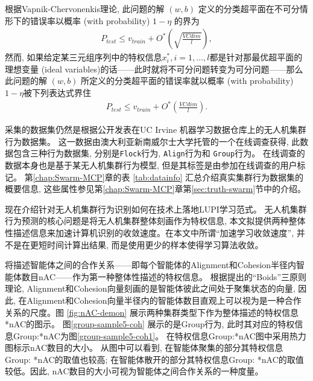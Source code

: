 根据Vapnik-Chervonenkis理论\citep{Vapnik2006}, 此问题的解 $(w,b)$ 定义的分类超平面在\textsf{不可分情形}下的错误率\textsc{以概率} (with probability) $1-\eta$ 的界为
\begin{align}
P_{test} \leq v_{train} + O^{*}(\sqrt{\frac{VCdim}{l}}),
\end{align}
然而, 如果给定某三元组序列中的特权信息$x_{i}^{*}, i=1,\ldots,l$都是针对那最优超平面的理想变量 (ideal variables)的话——此时就将\textsf{不可分问题}转变为\textsf{可分问题}——那么此问题的解 $(w,b)$ 所定义的分类超平面的错误率就\textsc{以概率} (with probability) $1-\eta$被下列表达式界住
\begin{align}
P_{test} \leq v_{train} + O^{*}(\frac{VCdim}{l}).
\end{align}


采集的数据集仍然是根据公开发表在UC Irvine 机器学习数据仓库上的无人机集群行为数据集。 这一数据由澳大利亚新南威尔士大学托管的一个在线调查获得, 此数据包含三种行为数据集, 分别是\texttt{Flock}行为, \texttt{Align}行为和 \texttt{Group}行为。 在线调查的数据本身也是基于某无人机集群行为模型, 但是其标签是由参加在线调查的用户标记。 第\ref{chap:Swarm-MCP}章的表 \ref{tab:datainfo} 汇总介绍真实集群行为数据集的概要信息, 这些属性参见第\ref{chap:Swarm-MCP}章第\ref{sec:truth-swarm}节中的介绍。

现在介绍针对无人机集群行为识别如何在技术上落地LUPI学习范式。 无人机集群行为预测的核心问题是将无人机集群整体刻画作为特权信息, 本文拟提供两种整体性描述信息来加速计算机识别的收敛速度。在本文中所谓“加速学习收敛速度”, 并不是在更短时间计算出结果, 而是使用更少的样本使得学习算法收敛。 

将描述智能体之间的合作关系——即每个智能体的Alignment和Cohesion半径内智能体数目{nAC}——作为第一种整体性描述的特权信息。 根据\citet{Flocks1987}提出的“Boids”三原则理论, Alignment和Cohesion向量刻画的是智能体彼此之间处于聚集状态的向量, 因此, 在Alignment和Cohesion向量半径内的智能体数目直观上可以视为是一种合作关系的尺度。图 \ref{fig:nAC-demon} 展示两种集群类型下作为整体描述的特权信息{*nAC}的图示。 图\ref{group-sample5-coh} 展示的是Group行为, 此时其对应的特权信息{Group:*nAC}为图\ref{group-sample5-coh1}。 在特权信息{Group:*nAC}图中采用热力图标示{nAC}数目的大小。 从图中可以看到, 在智能体聚集的部分其特权信息{Group: *nAC}的取值也较高; 在智能体散开的部分其特权信息{Group: *nAC}的取值较低。因此, {nAC}数目的大小可视为智能体之间合作关系的一种度量。


